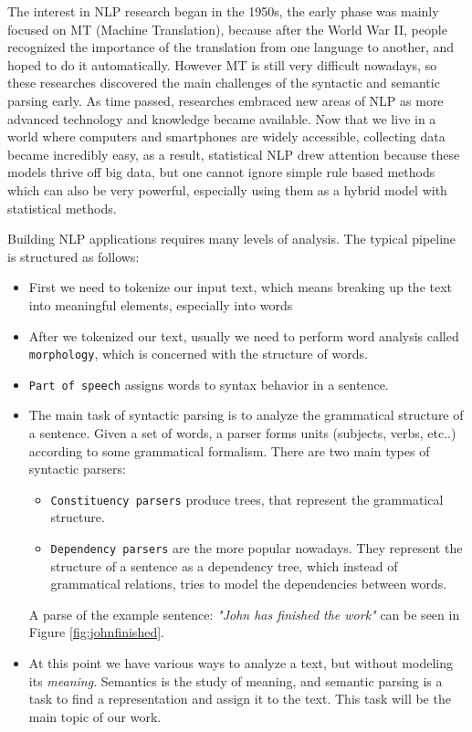 The interest in NLP research began in the 1950s, the early phase was mainly focused on MT (Machine Translation), because after the World War II, people
recognized the importance of the translation from one language to another, and hoped to do it automatically.
However MT is still very difficult nowadays, so these researches discovered the main challenges of the syntactic and semantic parsing early.
As time passed, researches embraced new areas of NLP as more advanced technology and knowledge became available. Now that we live in a world where
computers and smartphones are widely accessible, collecting data became incredibly easy, as a result, statistical NLP drew attention because these models thrive off big data, but one cannot ignore 
simple rule based methods which can also be very powerful, especially using them as a hybrid model with statistical methods.

Building NLP applications requires many levels of analysis.
The typical pipeline is structured as follows:
\begin{itemize}
	\item First we need to tokenize our input text, which means breaking up the text into meaningful elements, especially into words
	\item After we tokenized our text, usually we need to perform word analysis called \texttt{morphology}, which is concerned with the structure of words.
	\item \texttt{Part of speech} assigns words to syntax behavior in a sentence.
	\item The main task of syntactic parsing is to analyze the grammatical structure of a sentence. Given a set of words, a parser forms units (subjects, verbs, etc..) according to some grammatical formalism.
	There are two main types of syntactic parsers:
	\begin{itemize}
		\item \texttt{Constituency parsers} produce trees, that represent the grammatical structure.
		\item \texttt{Dependency parsers} are the more popular nowadays. They represent the structure of a sentence as a dependency tree, which instead of grammatical relations, tries to model the dependencies between words.
	\end{itemize}
	A parse of the example sentence: \textit{"John has finished the work"} can be seen in Figure \ref{fig:johnfinished}.
	
	\item At this point we have various ways to analyze a text, but without modeling its \textit{meaning}. Semantics is the study of meaning, and semantic parsing is a task to find a representation and assign it to the text. This task will be the main topic of our work.
\end{itemize}

